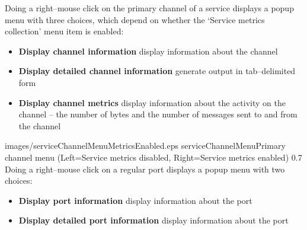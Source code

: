 Doing a right--mouse click on the primary channel of a service displays a popup menu with
three choices, which depend on whether the `Service metrics collection' menu item is
enabled:
\begin{itemize}
\item \textbf{Display channel information} display information about the channel
\item \textbf{Display detailed channel information} generate output in tab--delimited form
\item \textbf{Display channel metrics} display information about the activity on the
channel -- the number of bytes and the number of messages sent to and from the channel
\end{itemize}
%
{images/serviceChannelMenuMetricsEnabled.eps}%
{serviceChannelMenu}{Primary channel menu (Left=Service metrics disabled, Right=Service
metrics enabled)}%
{0.7}
\clearpage
Doing a right--mouse click on a regular port displays a popup menu with two choices:
\begin{itemize}
\item \textbf{Display port information} display information about the port
\item \textbf{Display detailed port information} display information about the port
\end{itemize}

